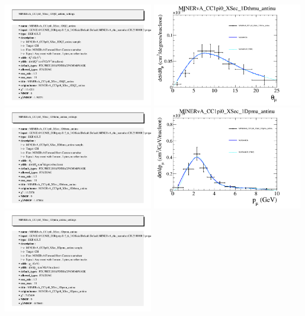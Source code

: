 \documentclass{article}
\begin{document}
\includegraphics[width=0.49\textwidth]{figures/nuisance_MINERvA_CC1pi0_XSec_1DQ2_antinu_info.png}
\centering
\includegraphics[width=0.49\textwidth]{figures/nuisance_MINERvA_CC1pi0_XSec_1Dthmu_antinu_comp.png}
\includegraphics[width=0.49\textwidth]{figures/nuisance_MINERvA_CC1pi0_XSec_1Dthmu_antinu_info.png}
\centering
\includegraphics[width=0.49\textwidth]{figures/nuisance_MINERvA_CC1pi0_XSec_1Dpmu_antinu_comp.png}
\includegraphics[width=0.49\textwidth]{figures/nuisance_MINERvA_CC1pi0_XSec_1Dpmu_antinu_info.png}
\end{document}
